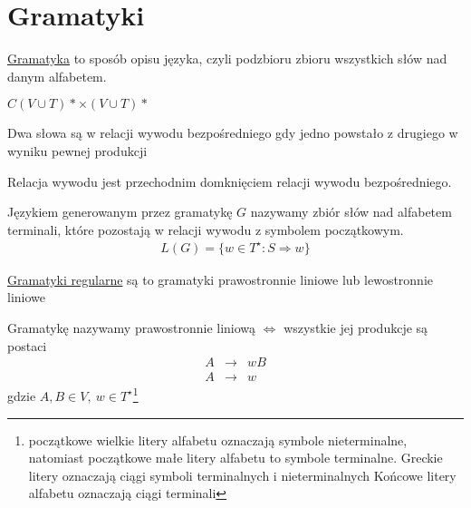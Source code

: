 \section{Gramatyki}
	
	\begin{df}
	\href{http://pl.wikipedia.org/wiki/Gramatyka_formalna}{Gramatyka} to sposób opisu języka, czyli podzbioru zbioru wszystkich
	 słów nad danym alfabetem.
	\end{df}
	\begin{df}
	$C(V \cup T)* \times (V \cup T)*$
	\end{df}
	
	\begin{tw}
	Dwa słowa są w relacji wywodu bezpośredniego gdy jedno powstało z drugiego w wyniku pewnej produkcji
	\end{tw}
	
	\begin{df}
	Relacja wywodu jest przechodnim domknięciem relacji wywodu bezpośredniego.
	\end{df}
	
	\begin{df}
	Językiem generowanym przez gramatykę $G$ nazywamy zbiór słów nad alfabetem terminali, które pozostają w relacji wywodu z 
	symbolem początkowym.
		\begin{eqnarray}
			L(G) = \{ w\in T^\star: S \Rightarrow w \}
		\end{eqnarray}
	\end{df}
	
	\begin{df}
	\href{http://pl.wikipedia.org/wiki/Gramatyka_regularna}{Gramatyki regularne} są to gramatyki prawostronnie liniowe lub 
	lewostronnie liniowe
	\end{df}
	
	\begin{df}
	Gramatykę nazywamy prawostronnie liniową $\Leftrightarrow$ wszystkie jej produkcje są postaci 
	\begin{eqnarray}
		A&\rightarrow&wB \\
		A&\rightarrow&w
	\end{eqnarray}
	gdzie $A, B \in V, ~ w\in T^\star$\footnote{początkowe wielkie litery alfabetu oznaczają symbole nieterminalne, 
	natomiast początkowe małe litery alfabetu to symbole terminalne. Greckie litery oznaczają ciągi symboli terminalnych i nieterminalnych
	Końcowe litery alfabetu oznaczają ciągi terminali}	 
	\end{df}
	
